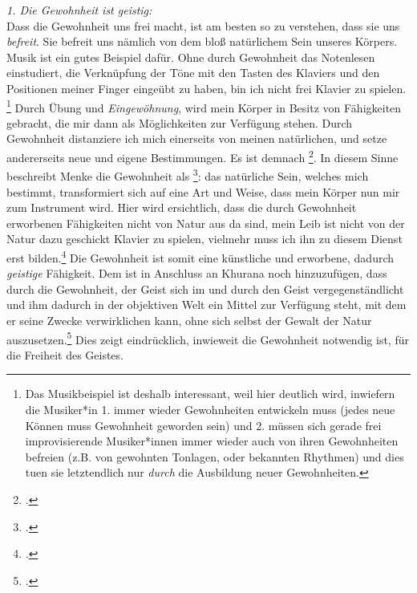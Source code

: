 \documentclass[12pt, a4paper, openany]{report}
\begin{document}
\emph{1. Die Gewohnheit ist geistig:}\\
Dass die Gewohnheit uns frei macht, ist am besten so zu verstehen, dass sie uns \emph{befreit}. 
Sie befreit uns nämlich von dem bloß natürlichem Sein unseres Körpers.
Musik ist ein gutes Beispiel dafür. 
Ohne durch Gewohnheit das Notenlesen einstudiert, die Verknüpfung der Töne mit den Tasten des Klaviers und den Positionen meiner Finger eingeübt zu haben, bin ich nicht frei Klavier zu spielen.%
\footnote{
    Das Musikbeispiel ist deshalb interessant, weil hier deutlich wird, inwiefern die Musiker*in 1. immer wieder Gewohnheiten entwickeln muss (jedes neue Können muss Gewohnheit geworden sein) und 2. müssen sich gerade frei improvisierende Musiker*innen immer wieder auch von ihren Gewohnheiten befreien (z.B. von gewohnten Tonlagen, oder bekannten Rhythmen) und dies tuen sie letztendlich nur \emph{durch} die Ausbildung neuer Gewohnheiten.
}
Durch Übung und \emph{Eingewöhnung}, wird mein Körper in Besitz von Fähigkeiten gebracht, die mir dann als Möglichkeiten zur Verfügung stehen.
Durch Gewohnheit distanziere ich mich einerseits von meinen natürlichen, und setze andererseits neue und eigene Bestimmungen. 
Es ist demnach \footcite[][§ 410 A, S. 185]{hegel_enzyklopädie_1969}.
In diesem Sinne beschreibt Menke die Gewohnheit als \footcite[][130]{menke_autonomie_2018}:
das natürliche Sein, welches mich bestimmt, transformiert sich auf eine Art und Weise, dass mein Körper nun mir zum Instrument wird.
Hier wird ersichtlich, dass die durch Gewohnheit erworbenen Fähigkeiten nicht von Natur aus da sind, mein Leib ist nicht von der Natur dazu geschickt Klavier zu spielen, vielmehr muss ich ihn zu diesem Dienst erst bilden.\footcite[Vgl.][§ 410 Z, S. 190]{hegel_enzyklopädie_1969}
Die Gewohnheit ist somit eine künstliche und erworbene, dadurch \emph{geistige} Fähigkeit.
Dem ist in Anschluss an Khurana noch hinzuzufügen, dass durch die Gewohnheit, der Geist sich im und durch den Geist vergegenständlicht und ihm dadurch in der objektiven Welt ein Mittel zur Verfügung steht, mit dem er seine Zwecke verwirklichen kann, ohne sich selbst der Gewalt der Natur auszusetzen.\footcite[Vgl.][426]{khurana_freiheit_2017}
Dies zeigt eindrücklich, inwieweit die Gewohnheit notwendig ist, für die Freiheit des Geistes.
\end{document}
